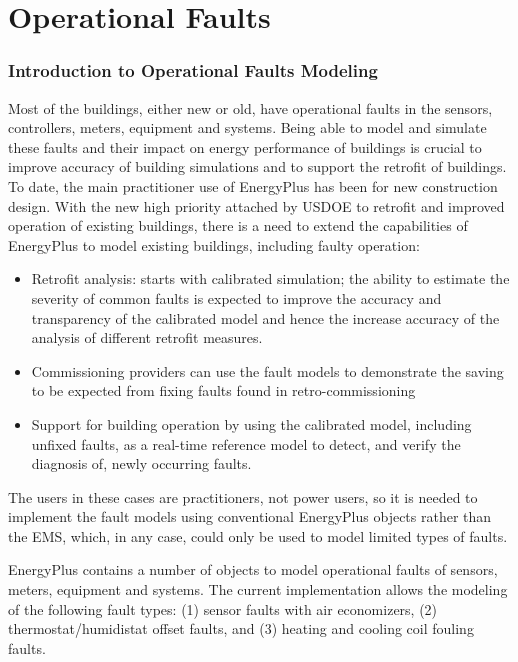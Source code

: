 \chapter{Operational Faults}\label{operational-faults}

\subsection{Introduction to Operational Faults Modeling}\label{introduction-to-operational-faults-modeling}

Most of the buildings, either new or old, have operational faults in the sensors, controllers, meters, equipment and systems. Being able to model and simulate these faults and their impact on energy performance of buildings is crucial to improve accuracy of building simulations and to support the retrofit of buildings. To date, the main practitioner use of EnergyPlus has been for new construction design. With the new high priority attached by USDOE to retrofit and improved operation of existing buildings, there is a need to extend the capabilities of EnergyPlus to model existing buildings, including faulty operation:

\begin{itemize}
\tightlist
\item
  Retrofit analysis: starts with calibrated simulation; the ability to estimate the severity of common faults is expected to improve the accuracy and transparency of the calibrated model and hence the increase accuracy of the analysis of different retrofit measures.\\
\item
  Commissioning providers can use the fault models to demonstrate the saving to be expected from fixing faults found in retro-commissioning
\item
  Support for building operation by using the calibrated model, including unfixed faults, as a real-time reference model to detect, and verify the diagnosis of, newly occurring faults.
\end{itemize}

The users in these cases are practitioners, not power users, so it is needed to implement the fault models using conventional EnergyPlus objects rather than the EMS, which, in any case, could only be used to model limited types of faults.

EnergyPlus contains a number of objects to model operational faults of sensors, meters, equipment and systems. The current implementation allows the modeling of the following fault types: (1) sensor faults with air economizers, (2) thermostat/humidistat offset faults, and (3) heating and cooling coil fouling faults.

